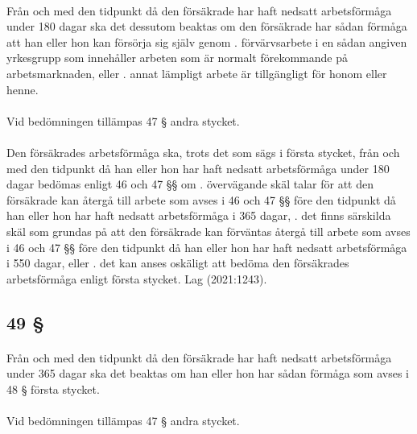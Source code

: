 \documentclass[a4paper,notitlepage,openany,10pt]{book}
\begin{document}
\paragraph*{}
Från och med den tidpunkt då den försäkrade har haft nedsatt arbetsförmåga under 180 dagar ska det dessutom beaktas om den försäkrade har sådan förmåga att han eller hon kan försörja sig själv genom
. förvärvsarbete i en sådan angiven yrkesgrupp som innehåller arbeten som är normalt förekommande på arbetsmarknaden, eller
. annat lämpligt arbete är tillgängligt för honom eller henne.
\paragraph*{}
Vid bedömningen tillämpas 47 § andra stycket.
\paragraph*{}
Den försäkrades arbetsförmåga ska, trots det som sägs i första stycket, från och med den tidpunkt då han eller hon har haft nedsatt arbetsförmåga under 180 dagar bedömas enligt 46 och 47 §§ om
. övervägande skäl talar för att den försäkrade kan återgå till arbete som avses i 46 och 47 §§ före den tidpunkt då han eller hon har haft nedsatt arbetsförmåga i 365 dagar,
. det finns särskilda skäl som grundas på att den försäkrade kan förväntas återgå till arbete som avses i 46 och 47 §§ före den tidpunkt då han eller hon har haft nedsatt arbetsförmåga i 550 dagar, eller
. det kan anses oskäligt att bedöma den försäkrades arbetsförmåga enligt första stycket.
Lag (2021:1243).
\subsection*{49 §}
\paragraph*{}
Från och med den tidpunkt då den försäkrade har haft nedsatt arbetsförmåga under 365 dagar ska det beaktas om han eller hon har sådan förmåga som avses i 48 § första stycket.
\paragraph*{}
Vid bedömningen tillämpas 47 § andra stycket.
\end{document}
